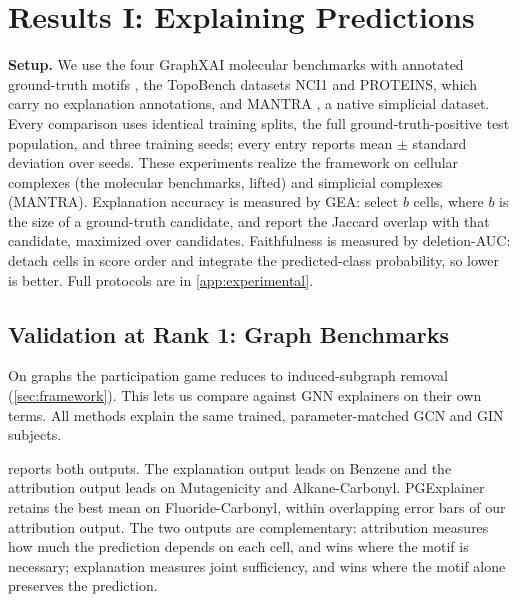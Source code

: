 \section{Results I: Explaining Predictions}
\label{sec:predictions}

\textbf{Setup.} We use the four GraphXAI molecular benchmarks with
annotated ground-truth motifs \citep{agarwal2023graphxai}, the
TopoBench datasets NCI1 and PROTEINS, which carry no explanation
annotations, and MANTRA \citep{ballester2025mantra}, a native
simplicial dataset. Every comparison uses identical training splits,
the full ground-truth-positive test population, and three training
seeds; every entry reports mean $\pm$ standard deviation over seeds.
These experiments realize the framework on
cellular complexes (the molecular benchmarks, lifted) and simplicial
complexes (MANTRA). Explanation accuracy is measured by GEA: select $b$ cells, where $b$ is
the size of a ground-truth candidate, and report the Jaccard overlap
with that candidate, maximized over candidates. Faithfulness is
measured by deletion-AUC: detach cells in score order and integrate the
predicted-class probability, so lower is better. Full protocols are in
\cref{app:experimental}.

\subsection{Validation at Rank 1: Graph Benchmarks}
\label{sec:predictions-rank1}

On graphs the participation game reduces to induced-subgraph removal
(\cref{sec:framework}). This lets us compare \method against GNN
explainers on their own terms. All methods explain the same trained,
parameter-matched GCN and GIN subjects.



  reports both
outputs. The explanation output leads on Benzene and the attribution
output leads on Mutagenicity and Alkane-Carbonyl. PGExplainer retains
the best mean on Fluoride-Carbonyl, within overlapping error bars of
our attribution output. The two outputs are complementary: attribution
measures how much the prediction depends on each cell, and wins where
the motif is necessary; explanation measures joint sufficiency, and
wins where the motif alone preserves the prediction.

